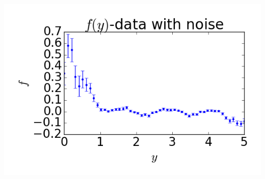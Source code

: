 \documentclass[8pt,pdf,hyperref={unicode}]{beamer}
\begin{document}
\begin{frame}
\begin{columns}
       \includegraphics[width=1\textwidth]{image/fig04.png}
    \end{columns}
\end{frame}
\end{document}
